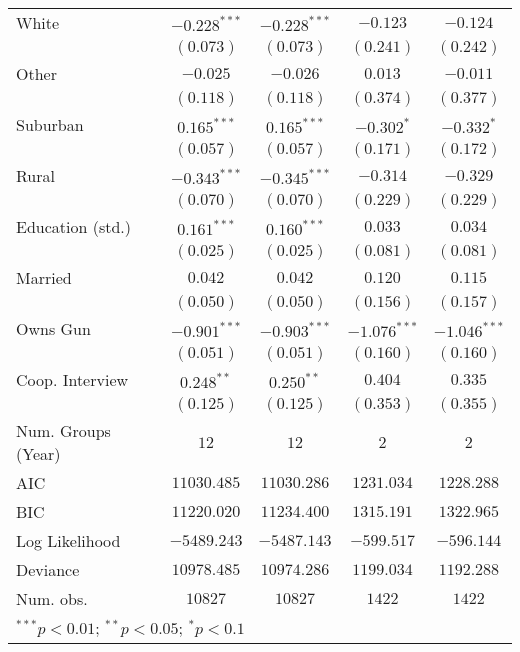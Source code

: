 \begin{table}
\begin{center}
\begin{tabular}{l c c c c}
White                   & $-0.228^{***}$ & $-0.228^{***}$ & $-0.123$       & $-0.124$       \\
                        & $(0.073)$      & $(0.073)$      & $(0.241)$      & $(0.242)$      \\
Other                   & $-0.025$       & $-0.026$       & $0.013$        & $-0.011$       \\
                        & $(0.118)$      & $(0.118)$      & $(0.374)$      & $(0.377)$      \\
Suburban                & $0.165^{***}$  & $0.165^{***}$  & $-0.302^{*}$   & $-0.332^{*}$   \\
                        & $(0.057)$      & $(0.057)$      & $(0.171)$      & $(0.172)$      \\
Rural                   & $-0.343^{***}$ & $-0.345^{***}$ & $-0.314$       & $-0.329$       \\
                        & $(0.070)$      & $(0.070)$      & $(0.229)$      & $(0.229)$      \\
Education (std.)        & $0.161^{***}$  & $0.160^{***}$  & $0.033$        & $0.034$        \\
                        & $(0.025)$      & $(0.025)$      & $(0.081)$      & $(0.081)$      \\
Married                 & $0.042$        & $0.042$        & $0.120$        & $0.115$        \\
                        & $(0.050)$      & $(0.050)$      & $(0.156)$      & $(0.157)$      \\
Owns Gun                & $-0.901^{***}$ & $-0.903^{***}$ & $-1.076^{***}$ & $-1.046^{***}$ \\
                        & $(0.051)$      & $(0.051)$      & $(0.160)$      & $(0.160)$      \\
Coop. Interview         & $0.248^{**}$   & $0.250^{**}$   & $0.404$        & $0.335$        \\
                        & $(0.125)$      & $(0.125)$      & $(0.353)$      & $(0.355)$      \\
\midrule
Num. Groups (Year)      & $12$           & $12$           & $2$            & $2$            \\
AIC                     & $11030.485$    & $11030.286$    & $1231.034$     & $1228.288$     \\
BIC                     & $11220.020$    & $11234.400$    & $1315.191$     & $1322.965$     \\
Log Likelihood          & $-5489.243$    & $-5487.143$    & $-599.517$     & $-596.144$     \\
Deviance                & $10978.485$    & $10974.286$    & $1199.034$     & $1192.288$     \\
Num. obs.               & $10827$        & $10827$        & $1422$         & $1422$         \\
\bottomrule
\multicolumn{5}{l}{\scriptsize{$^{***}p<0.01$; $^{**}p<0.05$; $^{*}p<0.1$}}
\end{tabular}
\label{table_school_logit}
\end{center}
\end{table}
